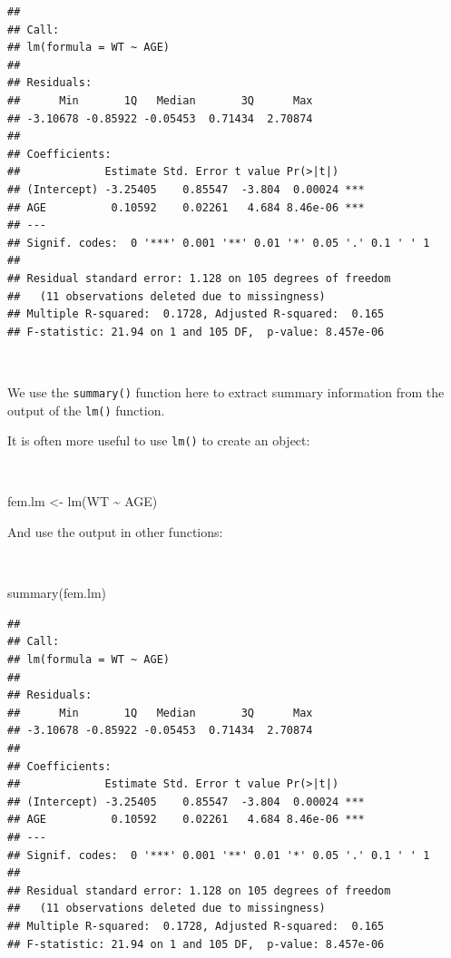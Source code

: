 \documentclass[
  12pt,
]{book}
\newenvironment{Shaded}{\begin{snugshade}}{\end{snugshade}}
\newcommand{\FunctionTok}[1]{\textcolor[rgb]{0.00,0.00,0.00}{#1}}
\newcommand{\NormalTok}[1]{#1}
\newcommand{\OtherTok}[1]{\textcolor[rgb]{0.56,0.35,0.01}{#1}}
\newcommand{\SpecialCharTok}[1]{\textcolor[rgb]{0.00,0.00,0.00}{#1}}
\begin{document}
\begin{verbatim}
## 
## Call:
## lm(formula = WT ~ AGE)
## 
## Residuals:
##      Min       1Q   Median       3Q      Max 
## -3.10678 -0.85922 -0.05453  0.71434  2.70874 
## 
## Coefficients:
##             Estimate Std. Error t value Pr(>|t|)    
## (Intercept) -3.25405    0.85547  -3.804  0.00024 ***
## AGE          0.10592    0.02261   4.684 8.46e-06 ***
## ---
## Signif. codes:  0 '***' 0.001 '**' 0.01 '*' 0.05 '.' 0.1 ' ' 1
## 
## Residual standard error: 1.128 on 105 degrees of freedom
##   (11 observations deleted due to missingness)
## Multiple R-squared:  0.1728, Adjusted R-squared:  0.165 
## F-statistic: 21.94 on 1 and 105 DF,  p-value: 8.457e-06
\end{verbatim}

~

We use the \texttt{summary()} function here to extract summary information from the output of the \texttt{lm()} function.

It is often more useful to use \texttt{lm()} to create an object:

~

\begin{Shaded}
\begin{Highlighting}[]
\NormalTok{fem.lm }\OtherTok{\textless{}{-}} \FunctionTok{lm}\NormalTok{(WT }\SpecialCharTok{\textasciitilde{}}\NormalTok{ AGE)}
\end{Highlighting}
\end{Shaded}

\newpage

And use the output in other functions:

~

\begin{Shaded}
\begin{Highlighting}[]
\FunctionTok{summary}\NormalTok{(fem.lm)}
\end{Highlighting}
\end{Shaded}

\begin{verbatim}
## 
## Call:
## lm(formula = WT ~ AGE)
## 
## Residuals:
##      Min       1Q   Median       3Q      Max 
## -3.10678 -0.85922 -0.05453  0.71434  2.70874 
## 
## Coefficients:
##             Estimate Std. Error t value Pr(>|t|)    
## (Intercept) -3.25405    0.85547  -3.804  0.00024 ***
## AGE          0.10592    0.02261   4.684 8.46e-06 ***
## ---
## Signif. codes:  0 '***' 0.001 '**' 0.01 '*' 0.05 '.' 0.1 ' ' 1
## 
## Residual standard error: 1.128 on 105 degrees of freedom
##   (11 observations deleted due to missingness)
## Multiple R-squared:  0.1728, Adjusted R-squared:  0.165 
## F-statistic: 21.94 on 1 and 105 DF,  p-value: 8.457e-06
\end{verbatim}
\end{document}
